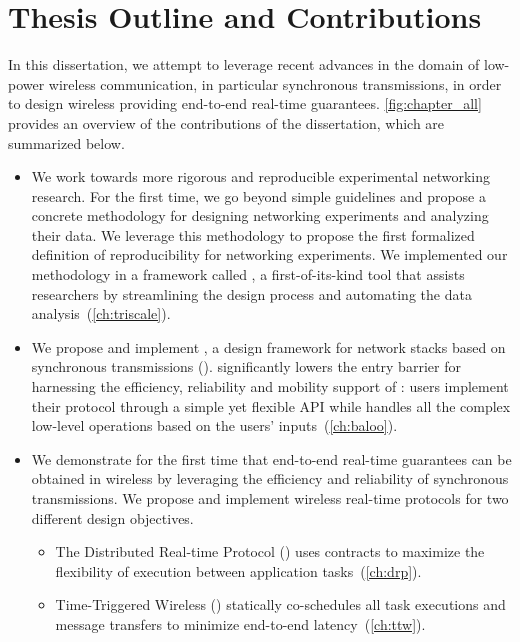 \pagebreak
\section{Thesis Outline and Contributions}

In this dissertation, we attempt to leverage recent advances in the domain of low-power wireless communication, in particular synchronous transmissions, in order to design wireless \CPS providing end-to-end real-time guarantees.
\cref{fig:chapter_all} provides an overview of the contributions of the dissertation, which are summarized below.
\begin{itemize}

  \item
  We work towards more rigorous and reproducible experimental networking research.
  For the first time, we go beyond simple guidelines and propose a concrete methodology for designing networking experiments and analyzing their data.
  We leverage this methodology to propose the first formalized definition of reproducibility for networking experiments.
  We implemented our methodology in a framework called \triscale, a first-of-its-kind tool that assists researchers by streamlining the design process and automating the data analysis~(\cref{ch:triscale}).

  \item
  We propose and implement \baloo, a design framework for network stacks based on synchronous transmissions (\ST).
  \baloo significantly lowers the entry barrier for harnessing the efficiency, reliability and mobility support of \ST:
  users implement their protocol through a simple yet flexible API while \baloo handles all the complex low-level operations based on the users' inputs~(\cref{ch:baloo}).

  \item
  We demonstrate for the first time that end-to-end real-time guarantees can be obtained in wireless \CPS by leveraging the efficiency and reliability of synchronous transmissions.
  We propose and implement wireless real-time protocols for two different design objectives.
  \begin{itemize}
    \item The Distributed Real-time Protocol (\DRP) uses contracts to maximize the flexibility of execution between application tasks~(\cref{ch:drp}).
    \item Time-Triggered Wireless (\TTW) statically co-schedules all task executions and message transfers to minimize end-to-end latency~(\cref{ch:ttw}).
  \end{itemize}

\end{itemize}


